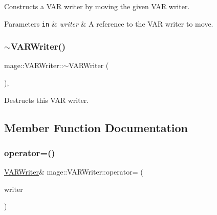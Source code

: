 Constructs a V\+AR writer by moving the given V\+AR writer.


\begin{DoxyParams}[1]{Parameters}
\mbox{\tt in}  & {\em writer} & A reference to the V\+AR writer to move. \\
\hline
\end{DoxyParams}
\hypertarget{classmage_1_1_v_a_r_writer_ad59bc50f1a5fdb04f59784c5b0b0d676}{}\label{classmage_1_1_v_a_r_writer_ad59bc50f1a5fdb04f59784c5b0b0d676} 
\subsubsection{\texorpdfstring{$\sim$\+V\+A\+R\+Writer()}{~VARWriter()}}
{\footnotesize\ttfamily mage\+::\+V\+A\+R\+Writer\+::$\sim$\+V\+A\+R\+Writer (\begin{DoxyParamCaption}{ }\end{DoxyParamCaption})\hspace{0.3cm}{\ttfamily [virtual]}, {\ttfamily [default]}}

Destructs this V\+AR writer. 

\subsection{Member Function Documentation}
\hypertarget{classmage_1_1_v_a_r_writer_aeb83b34d9768ca823a138abe3f9dea28}{}\label{classmage_1_1_v_a_r_writer_aeb83b34d9768ca823a138abe3f9dea28} 
\subsubsection{\texorpdfstring{operator=()}{operator=()}\hspace{0.1cm}{\footnotesize\ttfamily [1/2]}}
{\footnotesize\ttfamily \hyperlink{classmage_1_1_v_a_r_writer}{V\+A\+R\+Writer}\& mage\+::\+V\+A\+R\+Writer\+::operator= (\begin{DoxyParamCaption}\item[{const \hyperlink{classmage_1_1_v_a_r_writer}{V\+A\+R\+Writer} \&}]{writer }\end{DoxyParamCaption})\hspace{0.3cm}{\ttfamily [delete]}}


